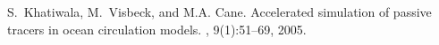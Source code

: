 \begin{thebibliography}{1}

S.~Khatiwala, M.~Visbeck, and M.A. Cane.
\newblock Accelerated simulation of passive tracers in ocean circulation
  models.
, 9(1):51--69, 2005.

\end{thebibliography}
